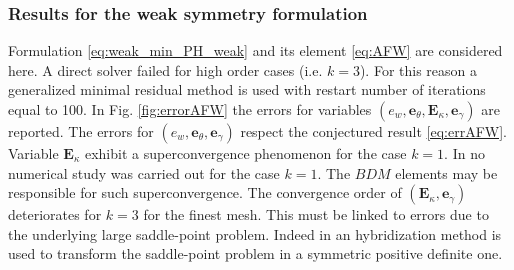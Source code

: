 \documentclass{ifacconf}
\begin{document}
\subsubsection{Results for the weak symmetry formulation} 
Formulation \eqref{eq:weak_min_PH_weak} and its element \eqref{eq:AFW} are considered here. A direct solver failed for high order cases (i.e. $k=3$). For this reason a generalized minimal residual method is used with restart number of iterations equal to 100. In Fig. \ref{fig:errorAFW} the errors for variables $(e_w, \bm{e}_\theta, \bm{E}_\kappa, \bm{e}_\gamma)$  are reported. The errors for $(e_w, \bm{e}_\theta, \bm{e}_\gamma)$ respect the conjectured result \eqref{eq:errAFW}. Variable $\bm{E}_\kappa$ exhibit a superconvergence phenomenon for the case $k=1$. In \cite{ArnoldWeak} no numerical study was carried out for the case $k=1$. The $BDM$ elements may be responsible for such superconvergence. The convergence order of $(\bm{E}_\kappa, \bm{e}_\gamma)$ deteriorates for $k=3$ for the finest mesh. This must be linked to errors due to the underlying large saddle-point problem. Indeed in \cite{ArnoldWeak} an hybridization method is used to transform the saddle-point problem in a symmetric positive definite one.
\end{document}
